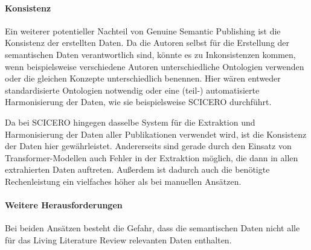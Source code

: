 \paragraph{Konsistenz}

Ein weiterer potentieller Nachteil von Genuine Semantic Publishing ist die Konsistenz der erstellten Daten.
Da die Autoren selbst für die Erstellung der semantischen Daten verantwortlich sind, könnte es zu Inkonsistenzen kommen, wenn beispielsweise verschiedene Autoren unterschiedliche Ontologien verwenden oder die gleichen Konzepte unterschiedlich benennen.
Hier wären entweder standardisierte Ontologien notwendig oder eine (teil-) automatisierte Harmonisierung der Daten, wie sie beispielsweise SCICERO durchführt.

Da bei SCICERO hingegen dasselbe System für die Extraktion und Harmonisierung der Daten aller Publikationen verwendet wird, ist die Konsistenz der Daten hier gewährleistet.
Andererseits sind \textemdash gerade durch den Einsatz von Transformer-Modellen \textemdash auch Fehler in der Extraktion möglich, die dann in allen extrahierten Daten auftreten.
Außerdem ist dadurch auch die benötigte Rechenleistung ein vielfaches höher als bei manuellen Ansätzen.


\paragraph{Weitere Herausforderungen}

Bei beiden Ansätzen besteht die Gefahr, dass die semantischen Daten nicht alle für das Living Literature Review relevanten Daten enthalten.
